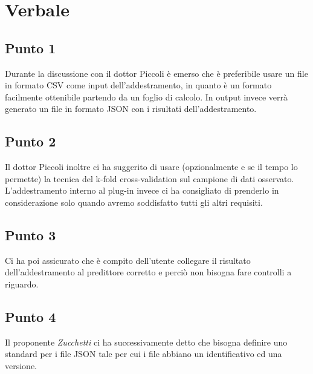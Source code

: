 \section{Verbale}
        \subsection{Punto 1}
            Durante la discussione con il dottor Piccoli è emerso che è preferibile usare un file in formato CSV come input dell'addestramento, in quanto è un formato facilmente ottenibile partendo da un foglio di calcolo. In output invece verrà generato un file in formato JSON con i risultati dell'addestramento.
        \subsection{Punto 2}
            Il dottor Piccoli inoltre ci ha suggerito di usare (opzionalmente e se il tempo lo permette) la tecnica del k-fold cross-validation sul campione di dati osservato. L'addestramento interno al plug-in invece ci ha consigliato di prenderlo in considerazione solo quando avremo soddisfatto tutti gli altri requisiti.
        \subsection{Punto 3}
            Ci ha poi assicurato che è compito dell'utente collegare il risultato dell'addestramento al predittore corretto e perciò non bisogna fare controlli a riguardo.
        \subsection{Punto 4}
            Il proponente \textit{Zucchetti} ci ha successivamente detto che bisogna definire uno standard per i file JSON tale per cui i file abbiano un identificativo ed una versione.